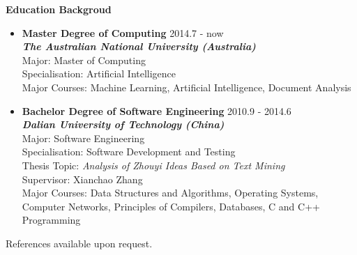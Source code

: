 \documentclass{res}
\newcommand{\resheading}[1]{{\normalsize \colorbox{mygrey}{\begin{minipage}{\textwidth}{\textbf{#1 \vphantom{p\^{E}}}}\end{minipage}}}}
\begin{document}
\begin{resume}
\begin{CJK*}{UTF8}{song}
\resheading{Education Backgroud}

\begin{itemize}
  \item{\bf Master Degree of Computing} \hfill 2014.7 - now \\
  					  \textbf{\textit{The Australian National University (Australia)}} \\
                      Major: Master of Computing \\
                      Specialisation: Artificial Intelligence \\
                      Major Courses: Machine Learning, Artificial Intelligence, Document Analysis
  \item{\bf Bachelor Degree of Software Engineering}   \hfill 2010.9 - 2014.6 \\
  \textbf{\textit{Dalian University of Technology (China)}} \\
                      Major: Software Engineering\\
                      Specialisation: Software Development and Testing \\
                      Thesis Topic: \textit{Analysis of Zhouyi Ideas Based on Text Mining} \\
                      Supervisor: Xianchao Zhang \\
                      Major Courses: Data Structures and Algorithms, Operating Systems, Computer Networks, Principles of Compilers, Databases, C and C++ Programming
\end{itemize}



References available upon request.

\end{CJK*}
\end{resume}
\end{document}
